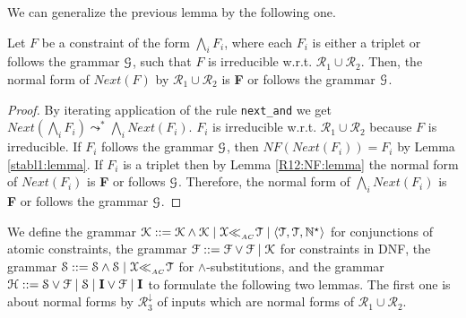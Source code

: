 \documentclass[submission,copyright,creativecommons]{eptcs}
\newcommand \matchth[3]{#1 {\ll}_{{ }_{#3}} {#2}}
\newcommand \matchAC[2]{\matchth{#1}{#2}{AC}}
\newcommand \trip[1]{\langle #1 \rangle}
\newcommand \Ronetwo{\ensuremath{\mathcal{R}_1\cup\mathcal{R}_2}}
\newcommand \Rthree{\ensuremath{\mathcal{R}_3^{\downarrow}}}
\newcommand \Eu[1]{\EuScript{#1}}
\numberwithin{subcase}{case}
\begin{document}
We can generalize the previous lemma by the following one.
\begin{lemma}
\label{stabl2:lemma}
Let $F$ be a constraint of the form $\bigwedge_{i} F_i$, where each 
$F_i$ is either a triplet or follows 
the grammar $\Eu{G}$, such that $F$ is irreducible w.r.t.  
$\mathcal{R}_1\cup \mathcal{R}_2$.
Then, the normal form of $\textit{Next}(F)$ by $\mathcal{R}_1\cup \mathcal{R}_2$
is \textbf{F} or follows the  grammar $\Eu{G}$.
\end{lemma}
\begin{proof}
By iterating application of the rule \texttt{next\_and} we get
$\textit{Next}(\bigwedge_{i} F_i)\leadsto^{*}\bigwedge_{i}\textit{Next}(F_i)$.
$F_i$ is irreducible w.r.t. $\mathcal{R}_1\cup \mathcal{R}_2$  because $F$ is
irreducible. If $F_i$ follows the grammar $\Eu{G}$, then
$\textit{NF}(\textit{Next}(F_i))=F_i$ by Lemma \ref{stabl1:lemma}. If $F_i$ is a triplet  
then  by  Lemma \ref{R12:NF:lemma} the normal form of $\textit{Next}(F_i)$
is \textbf{F} or follows $\Eu{G}$. Therefore, the normal form of
 $\bigwedge_{i}\textit{Next}(F_i)$ is \textbf{F} or follows  the  grammar
 $\Eu{G}$.
\end{proof}

We define the grammar $\Eu{K}::=\Eu{K}
\land \Eu{K}\;|\; \matchAC{\Eu{X}}{\Eu{T}}\;|\;
\trip{\Eu{T},\Eu{T},\mathbb{N}^{\star}}$ for conjunctions of atomic constraints,
the grammar $\Eu{F}::=\Eu{F}\lor \Eu{F} \;|\; \Eu{K}$ for
constraints in DNF, the grammar $\Eu{S} ::= \Eu{S} \land \Eu{S} \;|\;
\matchAC{\Eu{X}}{\Eu{T}}$ for $\land$-substitutions,
and the grammar $\Eu{H}::=\Eu{S} \lor \Eu{F}\;|\; \Eu{S}\;|\; \textbf{I}\lor
\Eu{F}\;|\; \textbf{I}$ to formulate the following two lemmas. The first one is
about normal forms by $\Rthree$ of inputs which are normal forms of $\Ronetwo$.
\end{document}
